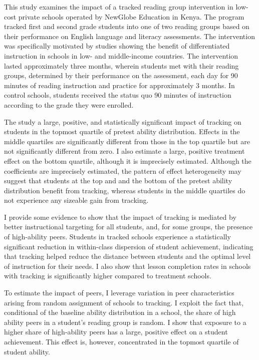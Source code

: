 \documentclass[12pt]{article}
\begin{document}
This study examines the impact of a tracked reading group intervention in low-cost private schools operated by NewGlobe Education in Kenya. The program tracked first and second grade students into one of two reading groups based on their performance on English language and literacy assessments. The intervention was specifically motivated by studies showing the benefit of differentiated instruction in schools in low- and middle-income countries. The intervention lasted approximately three months, wherein students met with their reading groups, determined by their performance on the assessment, each day for 90 minutes of reading instruction and practice for approximately 3 months. In control schools, students received the status quo 90 minutes of instruction according to the grade they were enrolled. 

The study a large, positive, and statistically significant impact of tracking on students in the topmost quartile of pretest ability distribution. Effects in the middle quartiles are significantly different from those in the top quartile but are not significantly different from zero. I also estimate a large, positive treatment effect on the bottom quartile, although it is imprecisely estimated. Although the coefficients are imprecisely estimated, the pattern of effect heterogeneity may suggest that students at the top and and the bottom of the pretest ability distribution benefit from tracking, whereas students in the middle quartiles do not experience any sizeable gain from tracking. 

I provide some evidence to show that the impact of tracking is mediated by better instructional targeting for all students, and, for some groups, the presence of high-ability peers. Students in tracked schools experience a statistically significant reduction in within-class dispersion of student achievement, indicating that tracking helped reduce the distance between students and the optimal level of instruction for their needs. I also show that lesson completion rates in schools with tracking is significantly higher compared to treatment schools. 

To estimate the impact of peers, I leverage variation in peer characteristics arising from random assignment of schools to tracking. I exploit the fact that, conditional of the baseline ability distribution in a school, the share of high ability peers in a student's reading group is random. I show that exposure to a higher share of high-ability peers has a large, positive effect on a student achievement. This effect is, however, concentrated in the topmost quartile of student ability. 
\end{document}
